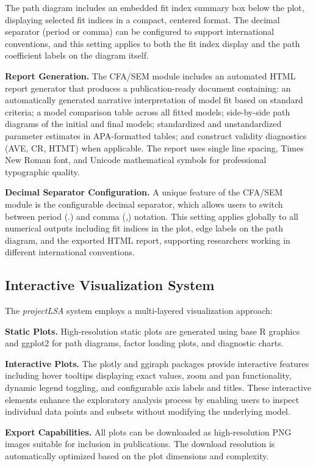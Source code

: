\documentclass[12pt,a4paper]{article}
\begin{document}
The path diagram includes an embedded fit index summary box below the plot, displaying selected fit indices in a compact, centered format. The decimal separator (period or comma) can be configured to support international conventions, and this setting applies to both the fit index display and the path coefficient labels on the diagram itself.

\textbf{Report Generation.} The CFA/SEM module includes an automated HTML report generator that produces a publication-ready document containing: an automatically generated narrative interpretation of model fit based on standard criteria; a model comparison table across all fitted models; side-by-side path diagrams of the initial and final models; standardized and unstandardized parameter estimates in APA-formatted tables; and construct validity diagnostics (AVE, CR, HTMT) when applicable. The report uses single line spacing, Times New Roman font, and Unicode mathematical symbols for professional typographic quality.

\textbf{Decimal Separator Configuration.} A unique feature of the CFA/SEM module is the configurable decimal separator, which allows users to switch between period (.) and comma (,) notation. This setting applies globally to all numerical outputs including fit indices in the plot, edge labels on the path diagram, and the exported HTML report, supporting researchers working in different international conventions.

\subsection{Interactive Visualization System}

The \textit{projectLSA} system employs a multi-layered visualization approach:

\textbf{Static Plots.} High-resolution static plots are generated using base R graphics and ggplot2 for path diagrams, factor loading plots, and diagnostic charts.

\textbf{Interactive Plots.} The plotly and ggiraph packages provide interactive features including hover tooltips displaying exact values, zoom and pan functionality, dynamic legend toggling, and configurable axis labels and titles. These interactive elements enhance the exploratory analysis process by enabling users to inspect individual data points and subsets without modifying the underlying model.

\textbf{Export Capabilities.} All plots can be downloaded as high-resolution PNG images suitable for inclusion in publications. The download resolution is automatically optimized based on the plot dimensions and complexity.
\end{document}
